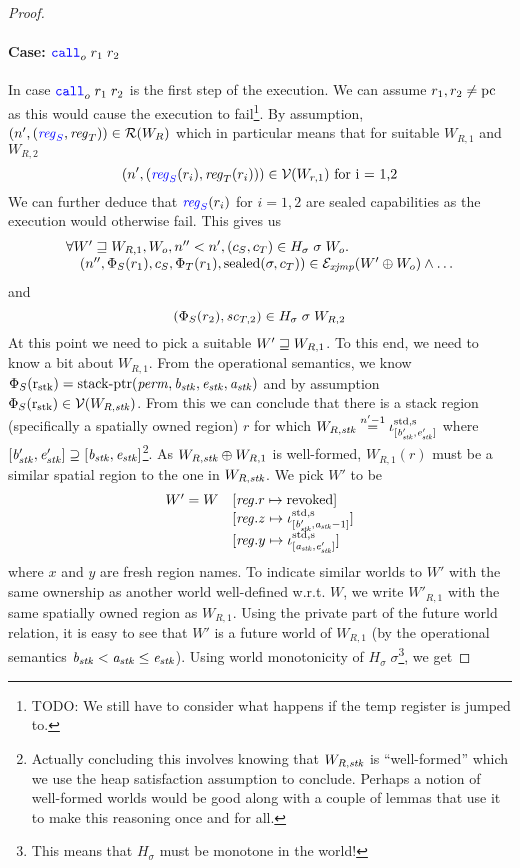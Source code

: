 \documentclass[a4paper]{article}
\begin{document}
\begin{proof}
\paragraph{Case: $\scall[o]{}{r_1}{r_2}$}
In case $\scall[o]{}{r_1}{r_2}$ is the first step of the execution. We can assume $r_1,r_2 \neq \pcreg$ as this would cause the execution to fail\footnote{{\color{red} TODO:} We still have to consider what happens if the temp register is jumped to.}. By assumption, $\npair[n']{\stpair{\reg}{\reg}} \in \lrr(W_R)$ which in particular means that for suitable $W_{R,1}$ and $W_{R,2}$
\[
  \npair[n']{(\src{\reg_S}(r_i),\reg_T(r_i))} \in \lrv(W_{r,1}) \text{ for i = 1,2}
\]
We can further deduce that $\src{\reg_S}(r_i)$ for $i=1,2$ are sealed capabilities as the execution would otherwise fail. This gives us
\[
  \begin{array}{l}
    \forall W' \future W_{R,1}, W_o, n'' < n', (c_S,c_T) \in H_\sigma \; \sigma \; W_o \ldotp \\
    \quad \npair[n'']{\Phi_S(r_1),c_S,\Phi_T(r_1),\sealed{\sigma,c_T}} \in \lrexj(W' \oplus W_o) \wedge \dots
  \end{array}
\]
and
\[
  (\Phi_S(r_2), \vsc_{T,2}) \in H_\sigma \; \sigma \; W_{R,2}
\]
At this point we need to pick a suitable $W' \future W_{R,1}$. To this end, we need to know a bit about $W_{R,1}$. From the operational semantics, we know $\Phi_S(\rstk) = \stkptr{\perm,\baddr_\stk,\eaddr_\stk,\aaddr_\stk}$ and by assumption $\Phi_S(\rstk) \in \lrv(W_{R,\stk})$. From this we can conclude that there is a stack region (specifically a spatially owned region) $r$ for which $W_{R,\stk} \nequal[n'-1] \stdreg{[\baddr_\stk',\eaddr_\stk']}{\spa}$ where $[\baddr_\stk',\eaddr_\stk'] \supseteq [\baddr_\stk,\eaddr_\stk]$\footnote{Actually concluding this involves knowing that $W_{R,\stk}$ is ``well-formed'' which we use the heap satisfaction assumption to conclude. Perhaps a notion of well-formed worlds would be good along with a couple of lemmas that use it to make this reasoning once and for all.}. As $W_{R,\stk} \oplus W_{R,1}$ is well-formed, $W_{R,1}(r)$ must be a similar spatial region to the one in $W_{R,\stk}$.
We pick $W'$ to be
\[
  \begin{array}{r l}
    W' = W     & \updReg{r}{\revoked}\\
               & \updReg{z}{\stdreg{[\baddr_\stk',\aaddr_\stk -1]}{\spa}}\\
               & \updReg{y}{\stdreg{[\aaddr_\stk,\eaddr_\stk']}{\spa}}
  \end{array}
\]
where $x$ and $y$ are fresh region names. To indicate similar worlds to $W'$ with the same ownership as another world well-defined w.r.t. $W$, we write $W'_{R,1}$ with the same spatially owned region as $W_{R,1}$. Using the private part of the future world relation, it is easy to see that $W'$ is a future world of $W_{R,1}$ (by the operational semantics $\baddr_\stk < \aaddr_\stk \leq \eaddr_\stk$). Using world monotonicity of $H_\sigma \; \sigma$\footnote{{\color{red}This means that $H_\sigma$ must be monotone in the world!}}, we get

\end{proof}
\end{document}
